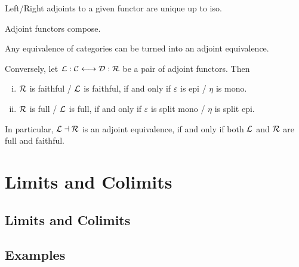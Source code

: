 	\begin{lemma}
		Left/Right adjoints to a given functor are unique up to  iso.

		Adjoint functors compose.
	\end{lemma}

	\begin{lemma}
		Any equivalence of categories can be turned into an adjoint equivalence.

		Conversely, let $\mathcal{L}: \mathcal{C} <-> \mathcal{D}: \mathcal{R}$ be a pair of adjoint functors. Then
		\begin{enumerate}[(i)]
			\item{
				$\mathcal{R}$ is faithful / $\mathcal{L}$ is faithful, if and only if $\varepsilon$ is epi / $\eta$ is mono.
			}
			\item{
				$\mathcal{R}$ is full / $\mathcal{L}$ is full, if and only if $\varepsilon$ is split mono / $\eta$ is split epi.
			}
		\end{enumerate}
		In particular, $\mathcal{L} \dashv \mathcal{R}$ is an adjoint equivalence, if and only if both $\mathcal{L}$ and $\mathcal{R}$ are full and faithful.
	\end{lemma}

	\section{Limits and Colimits}
	\subsection{Limits and Colimits}
	\subsection{Examples}

	\begin{proposition}
	\end{proposition}

